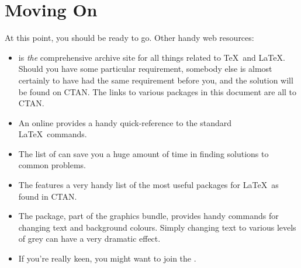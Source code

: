 \section{Moving On}
\label{sec:Conclusions}

At this point, you should be ready to go.  Other handy web resources:
\begin{itemize}
\item {} is \emph{the} comprehensive
    archive site for all things related to \TeX\ and \LaTeX. 
    Should you have some particular requirement, somebody else is
    almost certainly to have had the same requirement before you,
    and the solution will be found on \ac{CTAN}.  The links to
    various packages in this document are all to \ac{CTAN}.

\item An online
     provides a handy quick-reference
    to the standard \LaTeX\ commands.

\item The list of 
    can save you a huge amount of time in finding solutions to
    common problems.

\item The  features a very handy list of the most useful
    packages for \LaTeX\ as found in \ac{CTAN}.

\item The
    package, part of the graphics bundle, provides handy commands
    for changing text and background colours.  Simply changing
    text to various levels of grey can have a very 
    \textcolor{greytext}{dramatic effect}.


\item If you're really keen, you might want to join the
    .

\end{itemize}

\endinput

Any text after an \endinput is ignored.
You could put scraps here or things in progress.
